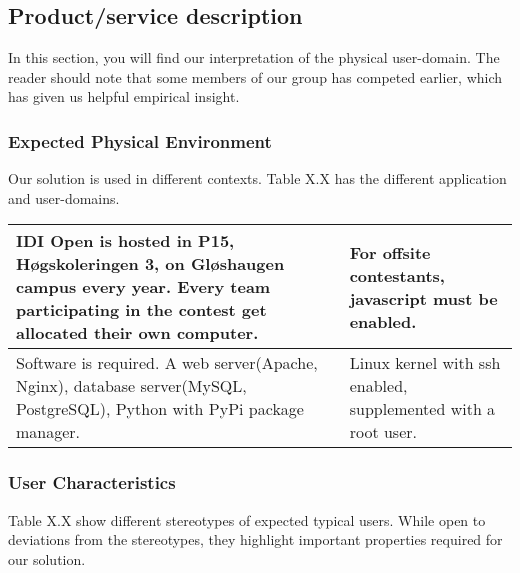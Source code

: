 \subsection{Product/service description}
In this section, you will find our interpretation of the physical user-domain.
The reader should note that some members of our group has competed earlier,
which has given us helpful empirical insight.

\subsubsection{Expected Physical Environment}
Our solution is used in different contexts. Table X.X has the different
application and user-domains.

\begin{tabular}{|m{3.1712599in}|m{3.1712599in}|}
\hline
IDI Open is hosted in P15, Høgskoleringen 3, on
Gløshaugen campus every year. Every team participating in the
contest get allocated their own computer. &
For offsite contestants, javascript must be enabled.\\
\hline
Software is required. A web server(Apache, Nginx), database
server(MySQL, PostgreSQL), Python with PyPi package manager.
 &
Linux kernel with ssh enabled, supplemented with a root user.
\\\hline
\end{tabular}

\subsubsection{User Characteristics}
Table X.X show different stereotypes of expected typical users. While open to
deviations from the stereotypes, they highlight important properties required
for our solution.

